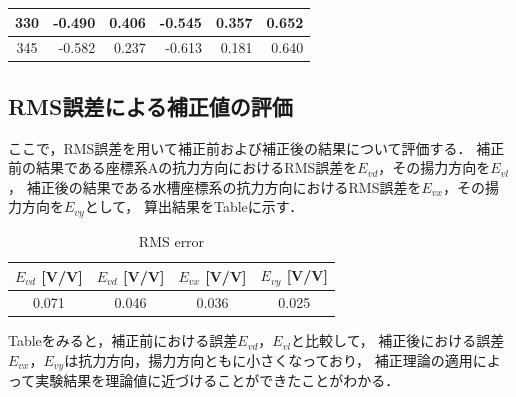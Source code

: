 \begin{table}[htbp]
\begin{center}
\begin{tabular}{|p{20mm}|p{20mm}|p{20mm}|p{20mm}|p{20mm}|p{20mm}|}
      \multicolumn{1}{|c|}{330}                     & \multicolumn{1}{|r|}{-0.490}               & \multicolumn{1}{|r|}{0.406}                & \multicolumn{1}{|r|}{-0.545}               & \multicolumn{1}{|r|}{0.357}                & \multicolumn{1}{|r|}{0.652}                    \\ \hline
      \multicolumn{1}{|c|}{345}                     & \multicolumn{1}{|r|}{-0.582}               & \multicolumn{1}{|r|}{0.237}                & \multicolumn{1}{|r|}{-0.613}               & \multicolumn{1}{|r|}{0.181}                & \multicolumn{1}{|r|}{0.640}                    \\ \hline
    \end{tabular}
  \end{center}
\end{table}

\newpage

\subsection{RMS誤差による補正値の評価}

ここで，RMS誤差を用いて補正前および補正後の結果について評価する．
補正前の結果である座標系Aの抗力方向におけるRMS誤差を$E_{vd}$，その揚力方向を$E_{vl}$，
補正後の結果である水槽座標系の抗力方向におけるRMS誤差を$E_{vx}$，その揚力方向を$E_{vy}$として，
算出結果をTableに示す．

\begin{table}[htbp]
  \begin{center}
    \caption{RMS error}
    \begin{tabular}{|p{20mm}|p{20mm}p{20mm}|p{20mm}|}
      \hline
      \multicolumn{1}{|c|}{$E_{vd}$ [V/V]} & \multicolumn{1}{|c|}{$E_{vd}$ [V/V]} & \multicolumn{1}{|c|}{$E_{vx}$ [V/V]} & \multicolumn{1}{|c|}{$E_{vy}$ [V/V]} \\ \hline
      \multicolumn{1}{|c|}{0.071}          & \multicolumn{1}{|c|}{0.046}          & \multicolumn{1}{|c|}{0.036}          & \multicolumn{1}{|c|}{0.025}          \\ \hline
    \end{tabular}
  \end{center}
\end{table}

Tableをみると，補正前における誤差$E_{vd}$，$E_{vl}$と比較して，
補正後における誤差$E_{vx}$，$E_{vy}$は抗力方向，揚力方向ともに小さくなっており，
補正理論の適用によって実験結果を理論値に近づけることができたことがわかる．